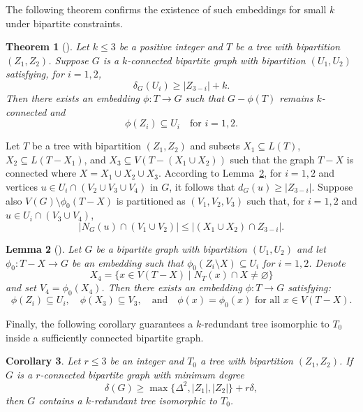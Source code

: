 \documentclass{article}
\newtheorem{theorem}{Theorem}[section]
\newtheorem{lemma}[theorem]{Lemma}
\newtheorem{corollary}[theorem]{Corollary}
\theoremstyle{definition}
\begin{document}
The following theorem confirms the existence of such embeddings for small $k$ under bipartite constraints.

\begin{theorem}[\cite{Hong25YYWu}]\label{thm4bipartite}
Let $k \leq 3$ be a positive integer and $T$ be a tree with bipartition $(Z_1,Z_2)$. Suppose $G$ is a $k$-connected bipartite graph with bipartition $(U_1,U_2)$ satisfying, for $i=1,2$,
\[
\delta_G(U_i) \geq |Z_{3-i}| + k.
\]
Then there exists an embedding $\phi: T \rightarrow G$ such that $G - \phi(T)$ remains $k$-connected and
\[
\phi(Z_i) \subseteq U_i \quad \text{for } i=1,2.
\]
\end{theorem}

Let $T$ be a tree with bipartition $(Z_1,Z_2)$ and subsets $X_1 \subseteq L(T)$, $X_2 \subseteq L(T - X_1)$, and $X_3 \subseteq V(T - (X_1 \cup X_2))$ such that the graph $T - X$ is connected where $X = X_1 \cup X_2 \cup X_3$. According to Lemma~\ref{lem4bipartite}, for $i=1,2$ and vertices $u \in U_i \cap (V_2 \cup V_3 \cup V_4)$ in $G$, it follows that $d_G(u) \geq |Z_{3-i}|.$
Suppose also $V(G) \setminus \phi_0(T - X)$ is partitioned as $(V_1, V_2, V_3)$ such that, for $i=1,2$ and $u \in U_i \cap (V_3 \cup V_4)$,
\[
|N_G(u) \cap (V_1 \cup V_2)| \leq | (X_1 \cup X_2) \cap Z_{3-i} |.
\]

\begin{lemma}[\cite{Hong25YYWu}]\label{lem4bipartite}
Let $G$ be a bipartite graph with bipartition $(U_1,U_2)$ and let $\phi_0: T - X \rightarrow G$ be an embedding such that $\phi_0(Z_i \setminus X) \subseteq U_i$ for $i=1,2$. Denote
\[
X_4 = \{ x \in V(T - X) \mid N_T(x) \cap X \neq \varnothing \}
\]
and set $V_4 = \phi_0(X_4)$. Then there exists an embedding $\phi: T \rightarrow G$ satisfying:
\[
\phi(Z_i) \subseteq U_i, \quad \phi(X_3) \subseteq V_3, \quad \text{and} \quad \phi(x) = \phi_0(x) \text{ for all } x \in V(T - X).
\]
\end{lemma}

Finally, the following corollary guarantees a $k$-redundant tree isomorphic to $T_0$ inside a sufficiently connected bipartite graph.

\begin{corollary}\label{cor1bipartite}
Let $r \leq 3$ be an integer and $T_0$ a tree with bipartition $(Z_1,Z_2)$. If $G$ is a $r$-connected bipartite graph with minimum degree
\[
\delta(G) \geq \max \{\Delta^2, |Z_1|, |Z_2| \} + r\delta,
\]
then $G$ contains a $k$-redundant tree isomorphic to $T_0$.
\end{corollary}
\end{document}
